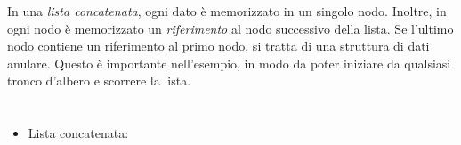 {{In una \emph{lista concatenata}, ogni dato è memorizzato in un singolo nodo. Inoltre, in ogni nodo è memorizzato un \emph{riferimento} al nodo successivo della lista. Se l’ultimo nodo contiene un riferimento al primo nodo, si tratta di una struttura di dati anulare. Questo è importante nell’esempio, in modo da poter iniziare da qualsiasi tronco d’albero e scorrere la lista.



\section*{\BrochureWebsitesAndKeywords}
{\raggedright
\begin{itemize}
  \item Lista concatenata: \href{https://it.wikipedia.org/wiki/Lista_concatenata}{}
\end{itemize}


}

}{}

\def\AuthorDagieneV{} %
\def\AuthorKinciusV{} %
\def\AuthorPohlW{} %
\def\AuthorBaumannL{} %
\def\AuthorSchluterK{} %
\def\AuthorDatzkoThutS{} %
\def\AuthorGiangC{} %

\newpage}{}
